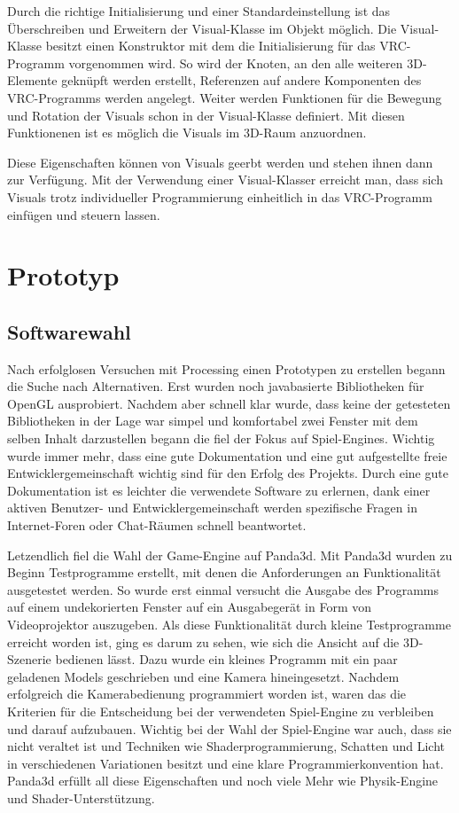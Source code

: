 Durch die richtige Initialisierung und einer Standardeinstellung ist das \"Uberschreiben und Erweitern der Visual-Klasse im
Objekt m\"oglich.
Die Visual-Klasse besitzt einen Konstruktor mit dem die Initialisierung f\"ur das VRC-Programm vorgenommen wird. So wird
der Knoten, an den alle weiteren 3D-Elemente gekn\"upft werden erstellt, Referenzen auf andere Komponenten des
VRC-Programms werden angelegt.
Weiter werden Funktionen f\"ur die Bewegung und Rotation der Visuals schon in der Visual-Klasse definiert. Mit diesen 
Funktionenen ist es m\"oglich die Visuals im 3D-Raum anzuordnen.

Diese Eigenschaften k\"onnen von Visuals geerbt werden und stehen ihnen dann zur Verf\"ugung. Mit der Verwendung einer
Visual-Klasser erreicht man, dass sich Visuals trotz individueller Programmierung einheitlich in das VRC-Programm
einf\"ugen und steuern lassen.

\section{Prototyp}

\subsection{Softwarewahl}

Nach erfolglosen Versuchen mit Processing einen Prototypen zu erstellen begann die Suche nach Alternativen. Erst
wurden noch javabasierte Bibliotheken f\"ur OpenGL ausprobiert. Nachdem aber schnell klar wurde, dass keine der
getesteten Bibliotheken in der Lage war simpel und komfortabel zwei Fenster mit dem selben Inhalt darzustellen begann 
die fiel der Fokus auf Spiel-Engines. Wichtig wurde immer mehr, dass eine gute Dokumentation und eine gut aufgestellte 
freie Entwicklergemeinschaft wichtig sind f\"ur den Erfolg des Projekts. Durch eine gute Dokumentation ist es 
leichter die verwendete Software zu erlernen, dank einer aktiven Benutzer- und Entwicklergemeinschaft werden spezifische
Fragen in Internet-Foren oder Chat-R\"aumen schnell beantwortet.

Letzendlich fiel die Wahl der Game-Engine auf Panda3d. Mit Panda3d wurden zu Beginn Testprogramme erstellt, mit denen
die Anforderungen an Funktionalit\"at ausgetestet werden. So wurde erst einmal versucht die Ausgabe des Programms
auf einem undekorierten Fenster auf ein Ausgabeger\"at in Form von Videoprojektor auszugeben. Als diese Funktionalit\"at
durch kleine Testprogramme erreicht worden ist, ging es darum zu sehen, wie sich die Ansicht auf die 3D-Szenerie
bedienen l\"asst. Dazu wurde ein kleines Programm mit ein paar geladenen Models geschrieben und eine Kamera hineingesetzt.
Nachdem erfolgreich die Kamerabedienung programmiert worden ist, waren das die Kriterien f\"ur die Entscheidung bei der
verwendeten Spiel-Engine zu verbleiben und darauf aufzubauen. Wichtig bei der Wahl der Spiel-Engine war auch, dass 
sie nicht veraltet ist und Techniken wie Shaderprogrammierung, Schatten und Licht in verschiedenen Variationen besitzt und
eine klare Programmierkonvention hat. Panda3d erf\"ullt all diese Eigenschaften und noch viele Mehr wie Physik-Engine und
Shader-Unterst\"utzung.

